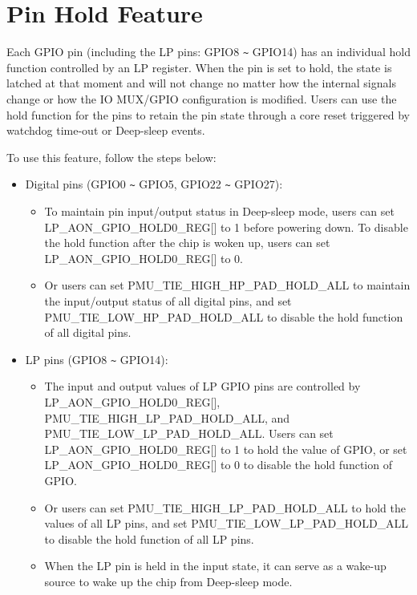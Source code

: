 \documentclass[main\_\_EN.tex]{subfiles}
\begin{document}
\section{Pin Hold Feature}\label{PadHold}

Each GPIO pin (including the LP pins: GPIO8 \verb+~+ GPIO14) has an individual hold function controlled by an LP register. When the pin is set to hold, the state is latched at that moment and will not change no matter how the internal signals change or how the IO MUX/GPIO configuration is modified. Users can use the hold function for the pins to retain the pin state through a core reset triggered by watchdog time-out or Deep-sleep events. 

To use this feature, follow the steps below:

\begin{itemize}
\item Digital pins (GPIO0 \verb+~+ GPIO5, GPIO22 \verb+~+ GPIO27):
    \begin{itemize}
        \item To maintain pin input/output status in Deep-sleep mode, users can set LP\_AON\_GPIO\_HOLD0\_REG[] to 1 before powering down. To disable the hold function after the chip is woken up, users can set LP\_AON\_GPIO\_HOLD0\_REG[] to 0.
        \item Or users can set PMU\_TIE\_HIGH\_HP\_PAD\_HOLD\_ALL to maintain the input/output status of all digital pins, and set PMU\_TIE\_LOW\_HP\_PAD\_HOLD\_ALL to disable the hold function of all digital pins.
    \end{itemize}
\item LP pins (GPIO8 \verb+~+ GPIO14):
    \begin{itemize}
        \item The input and output values of LP GPIO pins are controlled by LP\_AON\_GPIO\_HOLD0\_REG[], PMU\_TIE\_HIGH\_LP\_PAD\_HOLD\_ALL, and PMU\_TIE\_LOW\_LP\_PAD\_HOLD\_ALL. Users can set LP\_AON\_GPIO\_HOLD0\_REG[] to 1 to hold the value of GPIO, or set LP\_AON\_GPIO\_HOLD0\_REG[] to 0 to disable the hold function of GPIO.
        \item Or users can set PMU\_TIE\_HIGH\_LP\_PAD\_HOLD\_ALL to hold the values of all LP pins, and set PMU\_TIE\_LOW\_LP\_PAD\_HOLD\_ALL to disable the hold function of all LP pins.
        \item When the LP pin is held in the input state, it can serve as a wake-up source to wake up the chip from Deep-sleep mode.
    \end{itemize}
\end{itemize}
\end{document}
